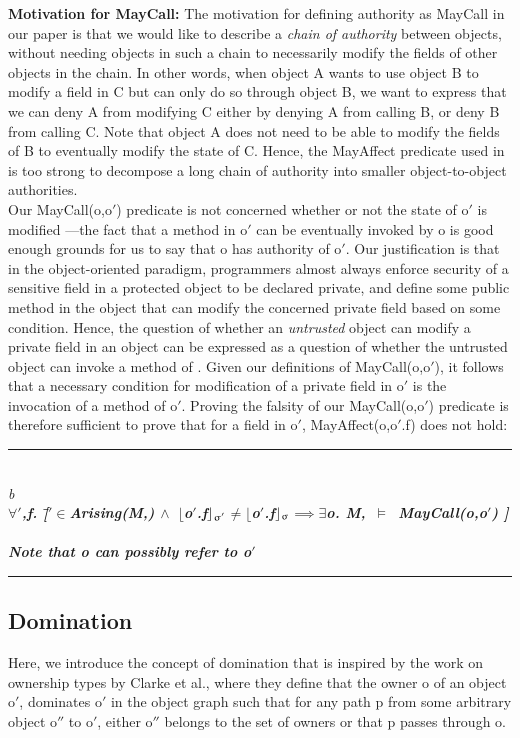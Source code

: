\documentclass[a4paper,11pt,twoside]{article}
\makeatletter
\newenvironment{logic}
{\begin{minipage}[c]{\linewidth}  \sffamily \mdseries \begin{tabbing}}
{\end{tabbing}\end{minipage}\vspace{0.3em}}
\newcommand{\loin}{$\in$}
\newcommand{\loforall}{$\forall$}
\newcommand{\loexists}{$\exists$}
\newcommand{\loand}{$\land$}
\newcommand{\loneq} {$\neq$}
\newcommand{\loimplies}{$\implies$}
\newcommand{\losigma}{\text{$\upsigma$}}
\newcommand{\loturns} {$\vDash$}
\newcommand{\loexec}[2] {$\lfloor$#1$\rfloor _{\text{#2}}$}
\newcommand{\hr}{\rule{\linewidth}{0.4pt}}
\DeclareRobustCommand{\emp}{%
  \@nomath\em \if b\expandafter\@car\f@series\@nil
  \normalfont \else \sffamily \bfseries \fi}
\makeatother
\begin{document}
\textbf{Motivation for MayCall:} The motivation for defining authority as MayCall in our paper is that we would like to describe a \textit{chain of authority} between objects, without needing objects in such a chain to necessarily modify the fields of other objects in the chain. In other words, when object A wants to use object B to modify a field in C but can only do so through object B, we want to express that we can deny A from modifying C either by denying A from calling B, or deny B from calling C. Note that object A does not need to be able to modify the fields of B to eventually modify the state of C. Hence, the MayAffect predicate used in \cite{drossopoulou2016} is too strong to decompose a long chain of authority into smaller object-to-object authorities.\\

Our MayCall(o,o$'$) predicate is not concerned whether or not the state of o$'$ is modified ---the fact that a method in o$'$ can be eventually invoked by o is good enough grounds for us to say that o has authority of o$'$. Our justification is that in the object-oriented paradigm, programmers almost always enforce security of a sensitive field in a protected object to be declared private, and define some public method in the object that can modify the concerned private field based on some condition. Hence, the question of whether an \textit{untrusted} object can modify a private field in an object  can be expressed as a question of whether the untrusted object can invoke a method of . Given our definitions of MayCall(o,o$'$), it follows that a necessary condition for modification of a private field in o$'$ is the invocation of a method of o$'$. Proving the falsity of our MayCall(o,o$'$) predicate is therefore sufficient to prove that for a field  in o$'$, MayAffect(o,o$'$.f) does not hold:
\begin{logic}
\hr\\
\emp{Lemma---[Field Modification Requires Authority]}\\
\loforall \losigma$'$,f. [\=\losigma$'$\loin Arising(M,\losigma) \loand\ \loexec{o$'$.f}{\losigma$'$}\loneq\loexec{o$'$.f}{\losigma}\loimplies \loexists o. M,\losigma\ \loturns\ MayCall(o,o$'$) ]\\
\\
\small\textit{Note that o can possibly refer to o$'$}\\
\hr
\end{logic}

\subsection{Domination}\label{sec:domination}
Here, we introduce the concept of domination that is inspired by the work on ownership types by Clarke et al.\cite{clarke1998}, where they define that the owner o of an object o$'$, dominates o$'$ in the object graph such that for any path p from some arbitrary object o$''$ to o$'$, either o$''$ belongs to the set of owners or that p passes through o.\\
\end{document}
